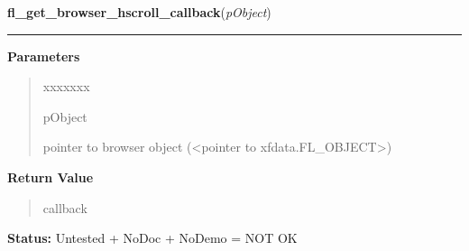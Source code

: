 \hspace{.8\funcindent}\begin{boxedminipage}{\funcwidth}

    \raggedright \textbf{fl\_get\_browser\_hscroll\_callback}(\textit{pObject})

    \vspace{-1.5ex}

    \rule{\textwidth}{0.5\fboxrule}
\setlength{\parskip}{2ex}
\setlength{\parskip}{1ex}
      \textbf{Parameters}
      \vspace{-1ex}

      \begin{quote}
        \begin{Ventry}{xxxxxxx}

          \item[pObject]

          pointer to browser object ({\textless}pointer to 
          xfdata.FL\_OBJECT{\textgreater})

        \end{Ventry}

      \end{quote}

      \textbf{Return Value}
    \vspace{-1ex}

      \begin{quote}
      callback

      \end{quote}

\textbf{Status:} Untested + NoDoc + NoDemo = NOT OK



    \end{boxedminipage}

    \label{xformslib:library:fl_get_browser_vscroll_callback}

    \vspace{0.5ex}

